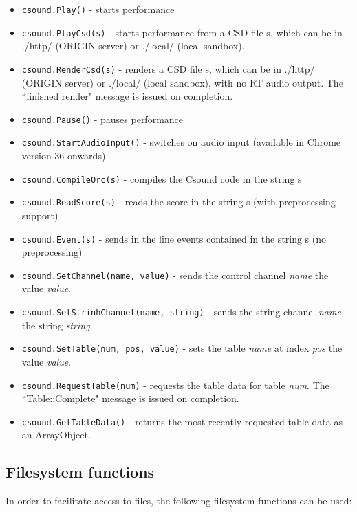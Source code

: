 \documentclass[11pt]{article}
\begin{document}
\begin{itemize}
\item {\tt csound.Play()} - starts performance
\item {\tt csound.PlayCsd(s)} - starts performance from a CSD file s, which can be in ./http/ (ORIGIN server) or ./local/ (local sandbox).
\item {\tt csound.RenderCsd(s)} - renders a CSD file s, which can be in ./http/ (ORIGIN server) or ./local/ (local sandbox), with no RT audio output.
The ``finished render" message is issued on completion.
\item {\tt csound.Pause()} - pauses performance
\item  {\tt csound.StartAudioInput()} - switches on audio input
  (available in Chrome version 36 onwards)
\item {\tt csound.CompileOrc(s)} - compiles the Csound code in the string s
\item {\tt csound.ReadScore(s)} - reads the score in the string s (with preprocessing support)
\item {\tt csound.Event(s)} - sends in the line events contained in the string s (no preprocessing)
\item {\tt csound.SetChannel(name, value)} - sends the control channel
  \emph{name} the value \emph{value}.
\item {\tt csound.SetStrinhChannel(name, string)} - sends the string channel
  \emph{name} the string \emph{string}.
\item {\tt csound.SetTable(num, pos, value)} - sets the table
  \emph{name} at index \emph{pos} the value \emph{value}.
\item {\tt csound.RequestTable(num)} - requests the table data for
  table \emph{num}. The ``Table::Complete" message is issued on completion. 
\item {\tt csound.GetTableData()} - returns the most recently
  requested table data as an ArrayObject. 
\end{itemize}

\subsection{Filesystem functions}

In order to facilitate access to files, the following filesystem functions can be used:
\end{document}

